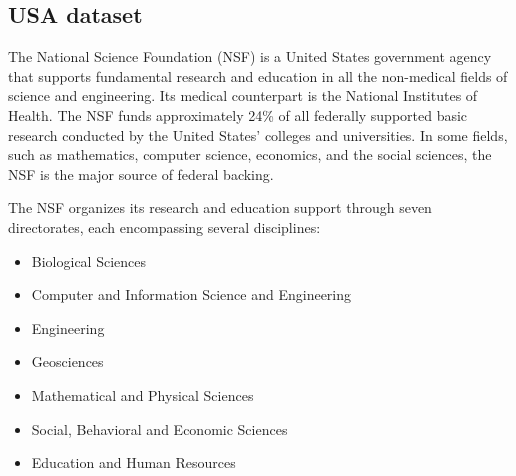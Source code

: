 \documentclass[12pt]{report}
\begin{document}
\subsection{USA dataset}

The National Science Foundation (NSF) is a United States government agency that supports fundamental research and education in all the non-medical fields of science and engineering. Its medical counterpart is the National Institutes of Health. The NSF funds approximately 24\% of all federally supported basic research conducted by the United States' colleges and universities. In some fields, such as mathematics, computer science, economics, and the social sciences, the NSF is the major source of federal backing.
 
The NSF organizes its research and education support through seven directorates, each encompassing several disciplines:

\begin{itemize}
\item Biological Sciences
\item Computer and Information Science and Engineering
\item Engineering
\item Geosciences
\item Mathematical and Physical Sciences
\item Social, Behavioral and Economic Sciences
\item Education and Human Resources
\end{itemize}
\end{document}
